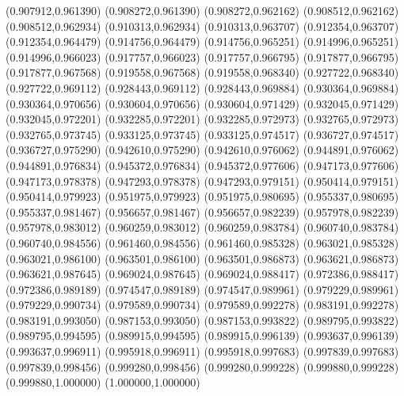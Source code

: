 (0.907912,0.961390)
(0.908272,0.961390)
(0.908272,0.962162)
(0.908512,0.962162)
(0.908512,0.962934)
(0.910313,0.962934)
(0.910313,0.963707)
(0.912354,0.963707)
(0.912354,0.964479)
(0.914756,0.964479)
(0.914756,0.965251)
(0.914996,0.965251)
(0.914996,0.966023)
(0.917757,0.966023)
(0.917757,0.966795)
(0.917877,0.966795)
(0.917877,0.967568)
(0.919558,0.967568)
(0.919558,0.968340)
(0.927722,0.968340)
(0.927722,0.969112)
(0.928443,0.969112)
(0.928443,0.969884)
(0.930364,0.969884)
(0.930364,0.970656)
(0.930604,0.970656)
(0.930604,0.971429)
(0.932045,0.971429)
(0.932045,0.972201)
(0.932285,0.972201)
(0.932285,0.972973)
(0.932765,0.972973)
(0.932765,0.973745)
(0.933125,0.973745)
(0.933125,0.974517)
(0.936727,0.974517)
(0.936727,0.975290)
(0.942610,0.975290)
(0.942610,0.976062)
(0.944891,0.976062)
(0.944891,0.976834)
(0.945372,0.976834)
(0.945372,0.977606)
(0.947173,0.977606)
(0.947173,0.978378)
(0.947293,0.978378)
(0.947293,0.979151)
(0.950414,0.979151)
(0.950414,0.979923)
(0.951975,0.979923)
(0.951975,0.980695)
(0.955337,0.980695)
(0.955337,0.981467)
(0.956657,0.981467)
(0.956657,0.982239)
(0.957978,0.982239)
(0.957978,0.983012)
(0.960259,0.983012)
(0.960259,0.983784)
(0.960740,0.983784)
(0.960740,0.984556)
(0.961460,0.984556)
(0.961460,0.985328)
(0.963021,0.985328)
(0.963021,0.986100)
(0.963501,0.986100)
(0.963501,0.986873)
(0.963621,0.986873)
(0.963621,0.987645)
(0.969024,0.987645)
(0.969024,0.988417)
(0.972386,0.988417)
(0.972386,0.989189)
(0.974547,0.989189)
(0.974547,0.989961)
(0.979229,0.989961)
(0.979229,0.990734)
(0.979589,0.990734)
(0.979589,0.992278)
(0.983191,0.992278)
(0.983191,0.993050)
(0.987153,0.993050)
(0.987153,0.993822)
(0.989795,0.993822)
(0.989795,0.994595)
(0.989915,0.994595)
(0.989915,0.996139)
(0.993637,0.996139)
(0.993637,0.996911)
(0.995918,0.996911)
(0.995918,0.997683)
(0.997839,0.997683)
(0.997839,0.998456)
(0.999280,0.998456)
(0.999280,0.999228)
(0.999880,0.999228)
(0.999880,1.000000)
(1.000000,1.000000)
